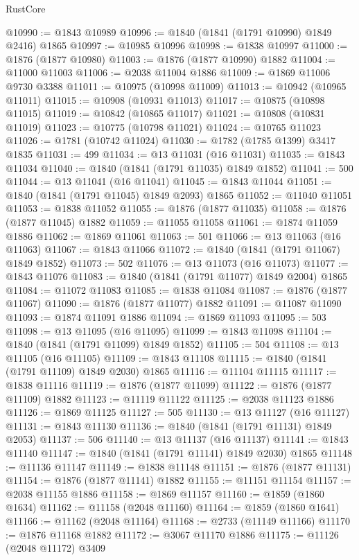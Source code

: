 \begin{lexlean}{RustCore}
\begin{coremodule}
@10990 := @1843 @10989
@10996 := @1840 (@1841 (@1791 @10990) @1849 @2416) @1865
@10997 := @10985 @10996
@10998 := @1838 @10997
@11000 := @1876 (@1877 @10980)
@11003 := @1876 (@1877 @10990) @1882
@11004 := @11000 @11003
@11006 := @2038 @11004 @1886
@11009 := @1869 @11006 @9730 @3388
@11011 := @10975 (@10998 @11009)
@11013 := @10942 (@10965 @11011)
@11015 := @10908 (@10931 @11013)
@11017 := @10875 (@10898 @11015)
@11019 := @10842 (@10865 @11017)
@11021 := @10808 (@10831 @11019)
@11023 := @10775 (@10798 @11021)
@11024 := @10765 @11023
@11026 := @1781 (@10742 @11024)
@11030 := @1782 (@1785 @1399) @3417 @1835
@11031 := 499
@11034 := @13 @11031 (@16 @11031)
@11035 := @1843 @11034
@11040 := @1840 (@1841 (@1791 @11035) @1849 @1852)
@11041 := 500
@11044 := @13 @11041 (@16 @11041)
@11045 := @1843 @11044
@11051 := @1840 (@1841 (@1791 @11045) @1849 @2093) @1865
@11052 := @11040 @11051
@11053 := @1838 @11052
@11055 := @1876 (@1877 @11035)
@11058 := @1876 (@1877 @11045) @1882
@11059 := @11055 @11058
@11061 := @1874 @11059 @1886
@11062 := @1869 @11061
@11063 := 501
@11066 := @13 @11063 (@16 @11063)
@11067 := @1843 @11066
@11072 := @1840 (@1841 (@1791 @11067) @1849 @1852)
@11073 := 502
@11076 := @13 @11073 (@16 @11073)
@11077 := @1843 @11076
@11083 := @1840 (@1841 (@1791 @11077) @1849 @2004) @1865
@11084 := @11072 @11083
@11085 := @1838 @11084
@11087 := @1876 (@1877 @11067)
@11090 := @1876 (@1877 @11077) @1882
@11091 := @11087 @11090
@11093 := @1874 @11091 @1886
@11094 := @1869 @11093
@11095 := 503
@11098 := @13 @11095 (@16 @11095)
@11099 := @1843 @11098
@11104 := @1840 (@1841 (@1791 @11099) @1849 @1852)
@11105 := 504
@11108 := @13 @11105 (@16 @11105)
@11109 := @1843 @11108
@11115 := @1840 (@1841 (@1791 @11109) @1849 @2030) @1865
@11116 := @11104 @11115
@11117 := @1838 @11116
@11119 := @1876 (@1877 @11099)
@11122 := @1876 (@1877 @11109) @1882
@11123 := @11119 @11122
@11125 := @2038 @11123 @1886
@11126 := @1869 @11125
@11127 := 505
@11130 := @13 @11127 (@16 @11127)
@11131 := @1843 @11130
@11136 := @1840 (@1841 (@1791 @11131) @1849 @2053)
@11137 := 506
@11140 := @13 @11137 (@16 @11137)
@11141 := @1843 @11140
@11147 := @1840 (@1841 (@1791 @11141) @1849 @2030) @1865
@11148 := @11136 @11147
@11149 := @1838 @11148
@11151 := @1876 (@1877 @11131)
@11154 := @1876 (@1877 @11141) @1882
@11155 := @11151 @11154
@11157 := @2038 @11155 @1886
@11158 := @1869 @11157
@11160 := @1859 (@1860 @1634)
@11162 := @11158 (@2048 @11160)
@11164 := @1859 (@1860 @1641)
@11166 := @11162 (@2048 @11164)
@11168 := @2733 (@11149 @11166)
@11170 := @1876 @11168 @1882
@11172 := @3067 @11170 @1886
@11175 := @11126 (@2048 @11172) @3409

\end{coremodule}
\end{lexlean}
